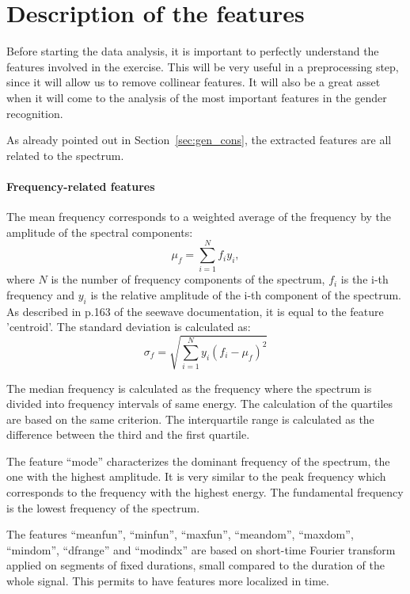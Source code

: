 \section{Description of the features}
\label{sec:feat_desc}
Before starting the data analysis, it is important to perfectly understand the features involved in the exercise. This will be very useful in a preprocessing step, since it will allow us to remove collinear features. It will also be a great asset when it will come to the analysis of the most important features in the gender recognition.

As already pointed out in Section~\ref{sec:gen_cons}, the extracted features are all related to the spectrum. 
\paragraph{Frequency-related features}
The mean frequency corresponds to a weighted average of the frequency by the amplitude of the spectral components:
\begin{equation}
\mu_f = \sum\limits_{i=1}^{N} f_i y_i ,
\end{equation} 
where $N$ is the number of frequency components of the spectrum, $f_i$ is the i-th frequency and $y_i$ is the relative amplitude of the i-th component of the spectrum. 
As described in p.\num{163} of the seewave documentation, it is equal to the feature 'centroid'.
The standard deviation is calculated as:
\begin{equation}
\sigma_f = \sqrt{\sum\limits_{i=1}^{N}y_i \left(f_i-\mu_f\right)^2}
\end{equation}

The median frequency is calculated as the frequency where the spectrum is divided into frequency intervals of same energy. The calculation of the quartiles are based on the same criterion. The interquartile range is calculated as the difference between the third and the first quartile.

The feature ``mode'' characterizes the dominant frequency of the spectrum, \ie the one with the highest amplitude. It is very similar to the peak frequency which corresponds to the frequency with the highest energy. The fundamental frequency is the lowest frequency of the spectrum.

The features ``meanfun'', ``minfun'', ``maxfun'', ``meandom'', ``maxdom'', ``mindom'', ``dfrange'' and ``modindx'' are based on short-time Fourier transform applied on segments of fixed durations, small compared to the duration of the whole signal. This permits to have features more localized in time.

